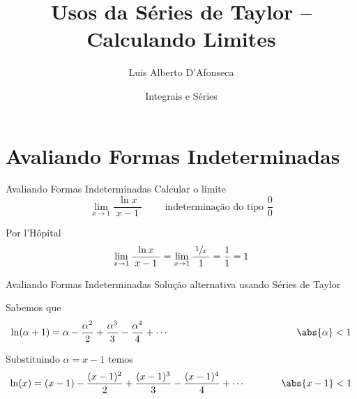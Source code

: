 
\usepackage{apresentacao}
\usepackage{mathconfig}
\usepackage{tabto}

\makeatletter
\graphicspath  {{./figs/}}
\makeatother

\setcounter{exemplo}{0}

\title {Usos da Séries de Taylor -- Calculando Limites}
\author{\large Luis Alberto D'Afonseca}
\date  {Integrais e Séries}



\begin{frame}
    \titlepage
\end{frame}

\section{Avaliando Formas Indeterminadas}

\begin{frame}{Avaliando Formas Indeterminadas}
Calcular o limite
\[
  \lim_{x\to 1} \frac{\ln x}{\;x-1\;} \qquad\text{ indeterminação do tipo } \frac{0}{0}
\]

\pause
\vspace{\baselineskip}
Por l'Hôpital
\[
  \lim_{x\to 1} \frac{\ln x}{\;x-1\;} = \lim_{x\to 1} \frac{\;\sfrac{1}{x}\;}{1} = \frac{1}{1} = 1
\]
\end{frame}

\begin{frame}{Avaliando Formas Indeterminadas}
Solução alternativa usando Séries de Taylor

\pause
\vspace{\baselineskip}
Sabemos que
\[
  \ln(\alpha+1) = \alpha - \frac{\alpha^2}{2}
                         + \frac{\alpha^3}{3}
                         - \frac{\alpha^4}{4}
                         + \cdots
  \hspace{46mm} \abs{\alpha} < 1
\]

\pause
\vspace{0.5\baselineskip}
Substituindo $\alpha=x-1$ temos
\[
  \ln(x) = (x-1) - \frac{(x-1)^2}{2}
                 + \frac{(x-1)^3}{3}
                 - \frac{(x-1)^4}{4}
                 + \cdots
  \hspace{13mm} \abs{x-1} < 1
\]
\end{frame}

